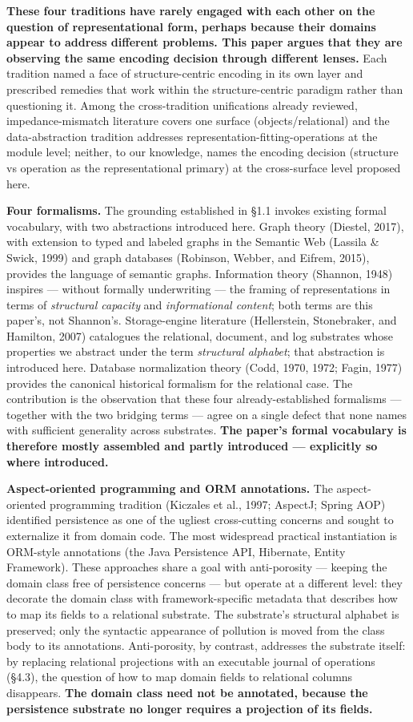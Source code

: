 \documentclass[
]{article}
\newcounter{none} %
\begin{document}
\textbf{These four traditions have rarely engaged with each other on the
question of representational form, perhaps because their domains appear
to address different problems. This paper argues that they are observing
the same encoding decision through different lenses.} Each tradition
named a face of structure-centric encoding in its own layer and
prescribed remedies that work within the structure-centric paradigm
rather than questioning it. Among the cross-tradition unifications
already reviewed, impedance-mismatch literature covers one surface
(objects/relational) and the data-abstraction tradition addresses
representation-fitting-operations at the module level; neither, to our
knowledge, names the encoding decision (structure vs operation as the
representational primary) at the cross-surface level proposed here.

\textbf{Four formalisms.} The grounding established in §1.1 invokes
existing formal vocabulary, with two abstractions introduced here. Graph
theory (Diestel, 2017), with extension to typed and labeled graphs in
the Semantic Web (Lassila \& Swick, 1999) and graph databases (Robinson,
Webber, and Eifrem, 2015), provides the language of semantic graphs.
Information theory (Shannon, 1948) inspires --- without formally
underwriting --- the framing of representations in terms of
\emph{structural capacity} and \emph{informational content}; both terms
are this paper's, not Shannon's. Storage-engine literature (Hellerstein,
Stonebraker, and Hamilton, 2007) catalogues the relational, document,
and log substrates whose properties we abstract under the term
\emph{structural alphabet}; that abstraction is introduced here.
Database normalization theory (Codd, 1970, 1972; Fagin, 1977) provides
the canonical historical formalism for the relational case. The
contribution is the observation that these four already-established
formalisms --- together with the two bridging terms --- agree on a
single defect that none names with sufficient generality across
substrates. \textbf{The paper's formal vocabulary is therefore mostly
assembled and partly introduced --- explicitly so where introduced.}

\textbf{Aspect-oriented programming and ORM annotations.} The
aspect-oriented programming tradition (Kiczales et al., 1997; AspectJ;
Spring AOP) identified persistence as one of the ugliest cross-cutting
concerns and sought to externalize it from domain code. The most
widespread practical instantiation is ORM-style annotations (the Java
Persistence API, Hibernate, Entity Framework). These approaches share a
goal with anti-porosity --- keeping the domain class free of persistence
concerns --- but operate at a different level: they decorate the domain
class with framework-specific metadata that describes how to map its
fields to a relational substrate. The substrate's structural alphabet is
preserved; only the syntactic appearance of pollution is moved from the
class body to its annotations. Anti-porosity, by contrast, addresses the
substrate itself: by replacing relational projections with an executable
journal of operations (§4.3), the question of how to map domain fields
to relational columns disappears. \textbf{The domain class need not be
annotated, because the persistence substrate no longer requires a
projection of its fields.}
\end{document}
